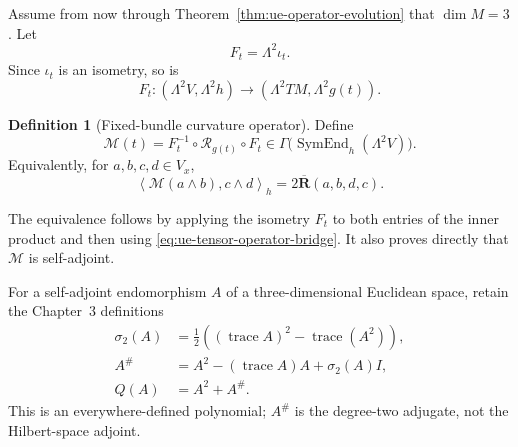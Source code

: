 \documentclass[10pt]{coll-l}
\newcommand{\trace}{\operatorname{trace}}
\theoremstyle{definition}
\newtheorem{definition}[theorem]{Definition}
\theoremstyle{remark}
\numberwithin{section}{chapter}
\numberwithin{equation}{chapter}
\begin{document}
Assume from now through Theorem~\ref{thm:ue-operator-evolution} that
$\dim M=3$.  Let
\[
                    F_t=\Lambda^2\iota_t.
\]
Since $\iota_t$ is an isometry, so is
\[
       F_t:(\Lambda^2V,\Lambda^2h)
              \longrightarrow
           (\Lambda^2TM,\Lambda^2g(t)).
\]

\begin{definition}[Fixed-bundle curvature operator]
\label{def:ue-fixed-curvature-operator}
Define
\begin{equation}
 \mathcal M(t)
    =F_t^{-1}\circ\mathcal R_{g(t)}\circ F_t
       \in\Gamma\bigl(\operatorname{SymEnd}_h(\Lambda^2V)\bigr).       \label{eq:ue-fixed-operator}
\end{equation}
Equivalently, for $a,b,c,d\in V_x$,
\begin{equation}
 \left\langle
    \mathcal M(a\wedge b),c\wedge d
 \right\rangle_h
    =2\overline{\mathbf R}(a,b,d,c).                    \label{eq:ue-fixed-operator-tensor}
\end{equation}
\end{definition}

The equivalence follows by applying the isometry $F_t$ to both entries of
the inner product and then using
\eqref{eq:ue-tensor-operator-bridge}.  It also proves directly that
$\mathcal M$ is self-adjoint.

For a self-adjoint endomorphism $A$ of a three-dimensional Euclidean
space, retain the Chapter~3 definitions
\begin{align}
 \sigma_2(A)
   &=\frac12\left((\trace A)^2-\trace(A^2)\right),        \label{eq:ue-sigma-two}\\
 A^\#
   &=A^2-(\trace A)A+\sigma_2(A)I,                       \label{eq:ue-sharp-polynomial}\\
 Q(A)&=A^2+A^\#.                                        \label{eq:ue-Q-polynomial}
\end{align}
This is an everywhere-defined polynomial; $A^\#$ is the degree-two
adjugate, not the Hilbert-space adjoint.
\end{document}
